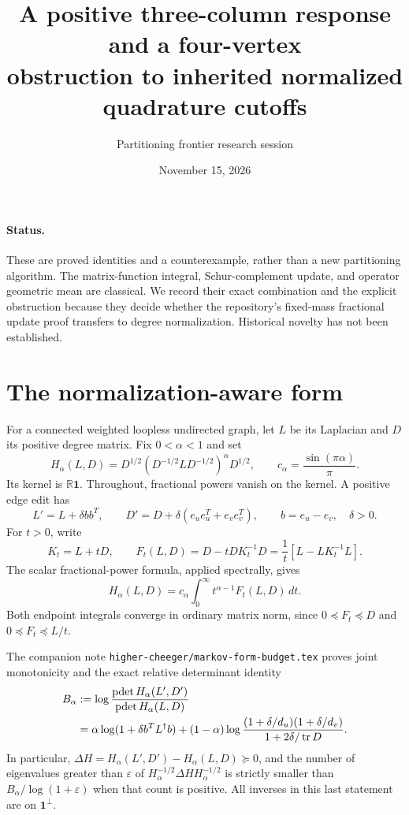 \documentclass[11pt]{article}
\title{A positive three-column response and a four-vertex\protect\\
obstruction to inherited normalized quadrature cutoffs}
\author{Partitioning frontier research session}
\date{November 15, 2026}
\newcommand{\R}{\mathbb R}
\newcommand{\Tr}{\operatorname{tr}}
\newcommand{\pdet}{\operatorname{pdet}}
\begin{document}
\maketitle

\paragraph{Status.}
These are proved identities and a counterexample, rather than a new
partitioning algorithm. The matrix-function integral, Schur-complement
update, and operator geometric mean are classical. We record their exact
combination and the explicit obstruction because they decide whether the
repository's fixed-mass fractional update proof transfers to degree
normalization. Historical novelty has not been established.

\section{The normalization-aware form}
For a connected weighted loopless undirected graph, let $L$ be its
Laplacian and $D$ its positive degree matrix. Fix $0<\alpha<1$ and set
\[
 H_\alpha(L,D)=D^{1/2}(D^{-1/2}LD^{-1/2})^\alpha D^{1/2},
 \qquad c_\alpha=\frac{\sin(\pi\alpha)}\pi.
\]
Its kernel is $\R\mathbf1$. Throughout, fractional powers vanish on the
kernel. A positive edge edit has
\[
 L'=L+\delta bb^T,\qquad
 D'=D+\delta(e_ue_u^T+e_ve_v^T),\qquad b=e_u-e_v,\quad\delta>0.
\]
For $t>0$, write
\[
 K_t=L+tD,\qquad
 F_t(L,D)=D-tD K_t^{-1}D
 =\frac1t[L-LK_t^{-1}L].
\]
The scalar fractional-power formula, applied spectrally, gives
\begin{equation}\label{eq:integral}
 H_\alpha(L,D)=c_\alpha\int_0^\infty t^{\alpha-1}F_t(L,D)\,dt.
\end{equation}
Both endpoint integrals converge in ordinary matrix norm, since
$0\preceq F_t\preceq D$ and $0\preceq F_t\preceq L/t$.

The companion note \texttt{higher-cheeger/markov-form-budget.tex}
proves joint monotonicity and the exact relative determinant identity
\begin{align}\label{eq:budget}
 B_\alpha&:=\log\frac{\pdet H_\alpha(L',D')}{\pdet H_\alpha(L,D)}\\
 &=\alpha\log(1+\delta b^TL^\dagger b)
 +(1-\alpha)\log\frac{(1+\delta/d_u)(1+\delta/d_v)}
 {1+2\delta/\Tr D}.\notag
\end{align}
In particular, $\Delta H=H_\alpha(L',D')-H_\alpha(L,D)\succeq0$,
and the number of eigenvalues greater than $\varepsilon$ of
$H_\alpha^{-1/2}\Delta H H_\alpha^{-1/2}$ is strictly smaller than
$B_\alpha/\log(1+\varepsilon)$ when that count is positive.
All inverses in this last statement are on $\mathbf1^\perp$.
\end{document}
